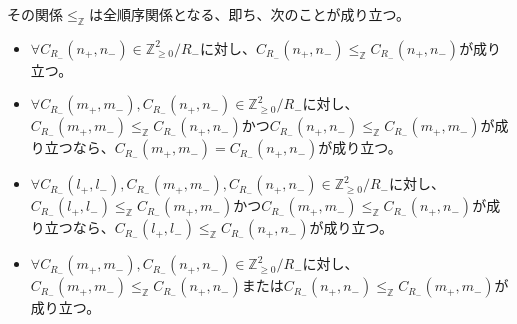 \documentclass[dvipdfmx]{jsarticle}
\begin{document}
\begin{thm}\label{1.2.6.7}
その関係$\leq_{\mathbb{Z}}$は全順序関係となる、即ち、次のことが成り立つ。
\begin{itemize}
\item
  $\forall C_{R_{-}}\left( n_{+},n_{-} \right) \in \mathbb{Z}_{\geq 0}^{2} /R_{-} $に対し、$C_{R_{-}}\left( n_{+},n_{-} \right) \leq_{\mathbb{Z}}C_{R_{-}}\left( n_{+},n_{-} \right)$が成り立つ。
\item
  $\forall C_{R_{-}}\left( m_{+},m_{-} \right),C_{R_{-}}\left( n_{+},n_{-} \right) \in \mathbb{Z}_{\geq 0}^{2} /R_{-} $に対し、$C_{R_{-}}\left( m_{+},m_{-} \right) \leq_{\mathbb{Z}}C_{R_{-}}\left( n_{+},n_{-} \right)$かつ$C_{R_{-}}\left( n_{+},n_{-} \right) \leq_{\mathbb{Z}}C_{R_{-}}\left( m_{+},m_{-} \right)$が成り立つなら、$C_{R_{-}}\left( m_{+},m_{-} \right) = C_{R_{-}}\left( n_{+},n_{-} \right)$が成り立つ。
\item
  $\forall C_{R_{-}}\left( l_{+},l_{-} \right),C_{R_{-}}\left( m_{+},m_{-} \right),C_{R_{-}}\left( n_{+},n_{-} \right) \in \mathbb{Z}_{\geq 0}^{2} /R_{-} $に対し、$C_{R_{-}}\left( l_{+},l_{-} \right) \leq_{\mathbb{Z}}C_{R_{-}}\left( m_{+},m_{-} \right)$かつ$C_{R_{-}}\left( m_{+},m_{-} \right) \leq_{\mathbb{Z}}C_{R_{-}}\left( n_{+},n_{-} \right)$が成り立つなら、$C_{R_{-}}\left( l_{+},l_{-} \right) \leq_{\mathbb{Z}}C_{R_{-}}\left( n_{+},n_{-} \right)$が成り立つ。
\item
  $\forall C_{R_{-}}\left( m_{+},m_{-} \right),C_{R_{-}}\left( n_{+},n_{-} \right) \in \mathbb{Z}_{\geq 0}^{2} /R_{-} $に対し、$C_{R_{-}}\left( m_{+},m_{-} \right) \leq_{\mathbb{Z}}C_{R_{-}}\left( n_{+},n_{-} \right)$または$C_{R_{-}}\left( n_{+},n_{-} \right) \leq_{\mathbb{Z}}C_{R_{-}}\left( m_{+},m_{-} \right)$が成り立つ。
\end{itemize}
\end{thm}
\end{document}
